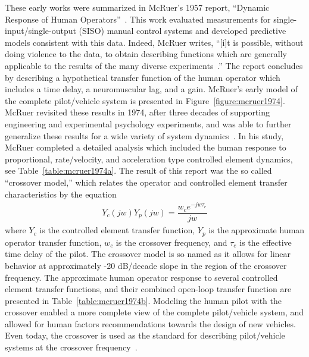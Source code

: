 \documentclass[float=false, crop=false]{standalone}
\begin{document}
These early works were summarized in McRuer's 1957 report, ``Dynamic Response of Human Operators''~\cite{McRuer1957}.
This work evaluated measurements for single-input/single-output (SISO) manual control systems and developed predictive models consistent with this data.
Indeed, McRuer writes, ``[i]t is possible, without doing violence to the data, to obtain describing functions which are generally applicable to the results of the many diverse experiments~\cite{McRuer1957}.''
The report concludes by describing a hypothetical transfer function of the human operator which includes a time delay, a neuromuscular lag, and a gain.
McRuer's early model of the complete pilot/vehicle system is presented in Figure~\ref{figure:mcruer1974}.
McRuer revisited these results in 1974, after three decades of supporting engineering and experimental psychology experiments, and was able to further generalize these results for a wide variety of system dynamics~\cite{McRuer1974}.
In his study, McRuer completed a detailed analysis which included the human response to proportional, rate/velocity, and acceleration type controlled element dynamics, see Table~\ref{table:mcruer1974a}.
The result of this report was the so called ``crossover model,'' which relates the operator and controlled element transfer characteristics by the equation
\begin{align}
Y_c(jw) Y_p(jw) = \dfrac{w_c e^{-jw \tau_e}}{jw}
\end{align}
where $Y_c$ is the controlled element transfer function, $Y_p$ is the approximate human operator transfer function, $w_c$ is the crossover frequency, and $\tau_e$ is the effective time delay of the pilot.
The crossover model is so named as it allows for linear behavior at approximately -20 dB/decade slope in the region of the crossover frequency.
The approximate human operator response to several controlled element transfer functions, and their combined open-loop transfer function are presented in Table~\ref{table:mcruer1974b}.
Modeling the human pilot with the crossover enabled a more complete view of the complete pilot/vehicle system, and allowed for human factors recommendations towards the design of new vehicles.
Even today, the crossover is used as the standard for describing pilot/vehicle systems at the crossover frequency~\cite{McRuer1965, McRuer1974, Xu2017}.
\end{document}
